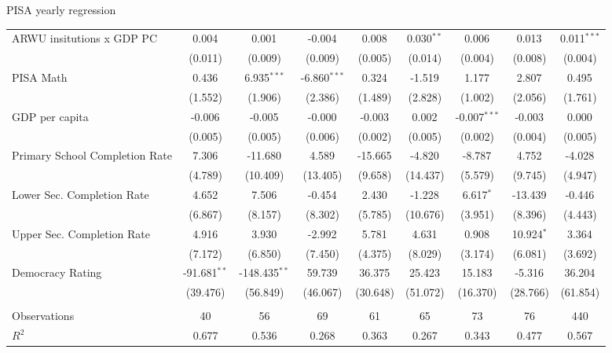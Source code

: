 \documentclass[10pt]{beamer}
\begin{document}
\begin{frame}{PISA yearly regression}
\begin{table}[!htbp]
{\begin{tabular}{@{\extracolsep{1pt}}lcccccccc}
                 ARWU insitutions x GDP PC & 0.004$^{}$ & 0.001$^{}$ & -0.004$^{}$ & 0.008$^{}$ & 0.030$^{**}$ & 0.006$^{}$ & 0.013$^{}$ & 0.011$^{***}$ \\
                & (0.011) & (0.009) & (0.009) & (0.005) & (0.014) & (0.004) & (0.008) & (0.004) \\
                 PISA Math & 0.436$^{}$ & 6.935$^{***}$ & -6.860$^{***}$ & 0.324$^{}$ & -1.519$^{}$ & 1.177$^{}$ & 2.807$^{}$ & 0.495$^{}$ \\
                & (1.552) & (1.906) & (2.386) & (1.489) & (2.828) & (1.002) & (2.056) & (1.761) \\
                 GDP per capita & -0.006$^{}$ & -0.005$^{}$ & -0.000$^{}$ & -0.003$^{}$ & 0.002$^{}$ & -0.007$^{***}$ & -0.003$^{}$ & 0.000$^{}$ \\
                & (0.005) & (0.005) & (0.006) & (0.002) & (0.005) & (0.002) & (0.004) & (0.005) \\
                 Primary School Completion Rate & 7.306$^{}$ & -11.680$^{}$ & 4.589$^{}$ & -15.665$^{}$ & -4.820$^{}$ & -8.787$^{}$ & 4.752$^{}$ & -4.028$^{}$ \\
                & (4.789) & (10.409) & (13.405) & (9.658) & (14.437) & (5.579) & (9.745) & (4.947) \\
                 Lower Sec. Completion Rate & 4.652$^{}$ & 7.506$^{}$ & -0.454$^{}$ & 2.430$^{}$ & -1.228$^{}$ & 6.617$^{*}$ & -13.439$^{}$ & -0.446$^{}$ \\
                & (6.867) & (8.157) & (8.302) & (5.785) & (10.676) & (3.951) & (8.396) & (4.443) \\
                 Upper Sec. Completion Rate & 4.916$^{}$ & 3.930$^{}$ & -2.992$^{}$ & 5.781$^{}$ & 4.631$^{}$ & 0.908$^{}$ & 10.924$^{*}$ & 3.364$^{}$ \\
                & (7.172) & (6.850) & (7.450) & (4.375) & (8.029) & (3.174) & (6.081) & (3.692) \\
                 Democracy Rating & -91.681$^{**}$ & -148.435$^{**}$ & 59.739$^{}$ & 36.375$^{}$ & 25.423$^{}$ & 15.183$^{}$ & -5.316$^{}$ & 36.204$^{}$ \\
                & (39.476) & (56.849) & (46.067) & (30.648) & (51.072) & (16.370) & (28.766) & (61.854) \\
                \hline \\[-1.8ex]
                 Observations & 40 & 56 & 69 & 61 & 65 & 73 & 76 & 440 \\
                 $R^2$ & 0.677 & 0.536 & 0.268 & 0.363 & 0.267 & 0.343 & 0.477 & 0.567 \\

\end{tabular}}
\end{table}
\end{frame}
\end{document}
